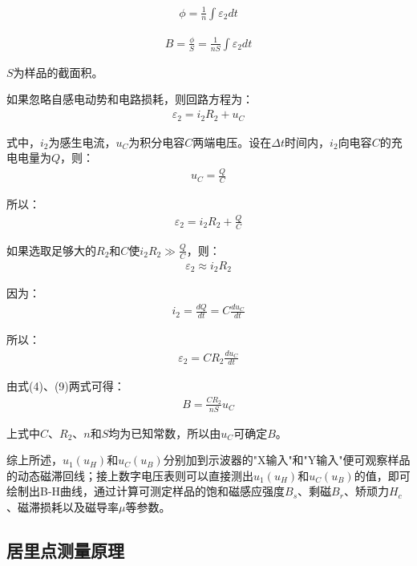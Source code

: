 ﻿\documentclass[12pt,a4paper]{article}
\begin{document}
\begin{align}
\phi = \frac{1}{n}\int\varepsilon_2 dt
\end{align}

\begin{align}
B = \frac{\phi}{S} = \frac{1}{nS}\int\varepsilon_2 dt \tag{4}
\end{align}

$S$为样品的截面积。

如果忽略自感电动势和电路损耗，则回路方程为：
\begin{align}
\varepsilon_2 = i_2R_2 + u_C
\end{align}

式中，$i_2$为感生电流，$u_C$为积分电容$C$两端电压。设在$\Delta t$时间内，$i_2$向电容$C$的充电电量为$Q$，则：
\begin{align}
u_C = \frac{Q}{C} \tag{5}
\end{align}

所以：
\begin{align}
\varepsilon_2 = i_2R_2 + \frac{Q}{C} \tag{6}
\end{align}

如果选取足够大的$R_2$和$C$使$i_2R_2 \gg \frac{Q}{C}$，则：
\begin{align}
\varepsilon_2 \approx i_2R_2 \tag{7}
\end{align}

因为：
\begin{align}
i_2 = \frac{dQ}{dt} = C\frac{du_C}{dt} \tag{8}
\end{align}

所以：
\begin{align}
\varepsilon_2 = CR_2\frac{du_C}{dt} \tag{9}
\end{align}

由式(4)、(9)两式可得：
\begin{align}
B = \frac{CR_2}{nS}u_C \tag{10}
\end{align}

上式中$C$、$R_2$、$n$和$S$均为已知常数，所以由$u_C$可确定$B$。

综上所述，$u_1(u_H)$和$u_C(u_B)$分别加到示波器的"X输入"和"Y输入"便可观察样品的动态磁滞回线；接上数字电压表则可以直接测出$u_1(u_H)$和$u_C(u_B)$的值，即可绘制出B-H曲线，通过计算可测定样品的饱和磁感应强度$B_s$、剩磁$B_r$、矫顽力$H_c$、磁滞损耗以及磁导率$\mu$等参数。

\subsection{居里点测量原理}
\end{document}
